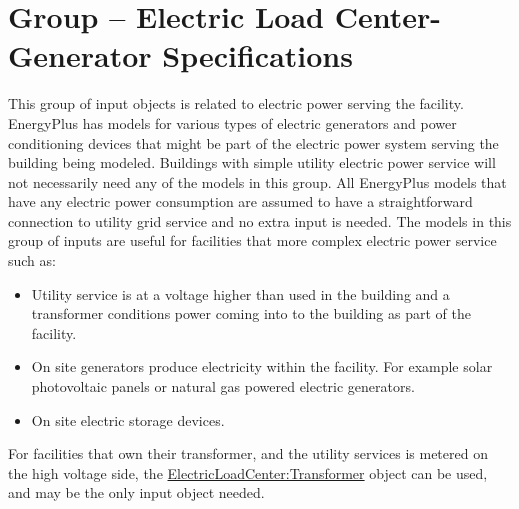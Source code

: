 \section{Group -- Electric Load Center-Generator Specifications}\label{group-electric-load-center-generator}

This group of input objects is related to electric power serving the facility. EnergyPlus has models for various types of electric generators and power conditioning devices that might be part of the electric power system serving the building being modeled. Buildings with simple utility electric power service will not necessarily need any of the models in this group. All EnergyPlus models that have any electric power consumption are assumed to have a straightforward connection to utility grid service and no extra input is needed. The models in this group of inputs are useful for facilities that more complex electric power service such as:

\begin{itemize}
\tightlist
\item
  Utility service is at a voltage higher than used in the building and a transformer conditions power coming into to the building as part of the facility.
\item
  On site generators produce electricity within the facility. For example solar photovoltaic panels or natural gas powered electric generators.
\item
  On site electric storage devices.
\end{itemize}

For facilities that own their transformer, and the utility services is metered on the high voltage side, the \hyperref[electricloadcentertransformer]{ElectricLoadCenter:Transformer} object can be used, and may be the only input object needed.

